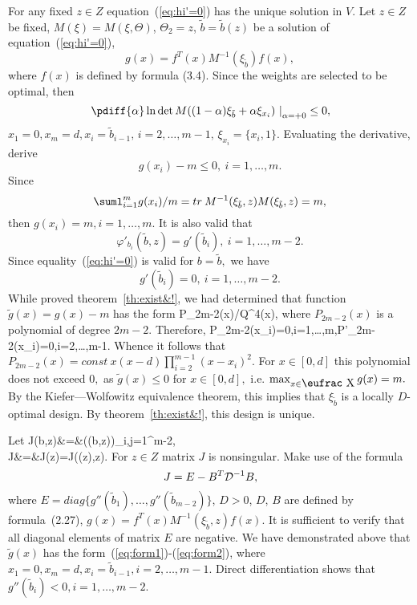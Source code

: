 \bl
 \label{th:system_have_solution}
 For any fixed $z\in Z$ equation~(\ref{eq:hi'=0})
 has the unique solution in $V.$
\el
\bproof
Let $z\in Z$ be fixed, $M(\xi)=M(\xi,\Theta)$, $\Theta_2=z$,
$\tilde{b}=\tilde{b}(z)$ be a solution of equation~(\ref{eq:hi'=0}),
$$
 g(x)=f^T(x)M^{-1}(\xi_{\tilde{b}})f(x),
$$
where $f(x)$ is defined by formula (3.4).
Since the weights are selected to be optimal, then
$$
 \left. \pdiff{\alpha} \ln \det M((1-\alpha)\xi_{\tilde{b}}+\alpha\xi_{x_i}) \
  \right|_{\alpha=+0}\le 0,
$$
$x_1=0,x_m=d,x_i=\tilde{b}_{i-1},\,i=2,\ldots,m-1,\,\xi_{x_i}=\{x_i,1\}.$
Evaluating the derivative, derive
$$
 g(x_i)-m\le 0,\>i=1,\ldots,m.
$$
Since
$$
 \suml_{i=1}^m g(x_i)/m=tr\> M^{-1}(\xi_{\tilde{b}},z)
  M(\xi_{\tilde{b}},z)=m,
$$
then $g(x_i)=m,i=1,\ldots,m$.
It is also valid that
$$
 \varphi'_{b_i}(\tilde{b},z)=g'(\tilde{b}_i),\>i=1,\ldots,m-2.
$$
Since equality~(\ref{eq:hi'=0}) is valid for $b=\tilde{b},$ we have
$$
 g'(\tilde{b}_i)=0,\>i=1,\ldots,m-2.
$$
While proved theorem~\ref{th:exist&!}, we had determined that
function $\tilde{g}(x)=g(x)-m$ has the form
\beq
 P_{2m-2}(x)/Q^4(x),
 \label{eq:form1}
\eeq
where $P_{2m-2}(x)$ is a polynomial of degree $2m-2.$
Therefore,
\beq
 P_{2m-2}(x_i)=0,i=1,\ldots,m,\>\>P'_{2m-2}(x_i)=0,i=2,\ldots,m-1.
 \label{eq:form2}
\eeq
Whence it follows that $P_{2m-2}(x)=const\>x(x-d)\prod_{i=2}^{m-1}(x-x_i)^2.$
For $x\in [0,d]$ this polynomial does not exceed $0,$
as $\tilde{g}(x)\le 0$ for $x\in [0,d],$
i.e. $\max_{x\in{\mbox{\eufrac X}}}g(x)=m.$
By the Kiefer---Wolfowitz equivalence theorem, this implies that
$\xi_{\tilde{b}}$ is a locally $D$-optimal design. By
theorem~\ref{th:exist&!}, this design is unique.
\elproof

Let
\bea
 J(b,z)&=&\left(\varphi(b,z)\right)_{i,j=1}^{m-2},\nonumber\\
 J&=&J(z)=J(\tilde{b}(z),z).\nonumber
\eea
\bl
 \label{th:Junspecial}
 For $z\in Z$ matrix $J$ is nonsingular.
\el
\bproof
Make use of the formula
$$
J=E-B^T{\cal D}^{-1}B,
$$
where $E=diag\{g''(\tilde{b}_1),\ldots,g''(\tilde{b}_{m-2})\}$,
$D>0$, $D$, $B$ are defined by formula~(2.27),
$g(x)=f^T(x)M^{-1}(\xi_{\tilde{b}},z)f(x).$
It is sufficient to verify that all diagonal elements of matrix $E$ are
negative. We have demonstrated above that $\tilde{g}(x)$ has the
form~(\ref{eq:form1})-(\ref{eq:form2}), where
$x_1=0,x_m=d,x_i=\tilde{b}_{i-1},i=2,\ldots,m-1.$
Direct differentiation shows that $g''(\tilde{b}_i)<0,i=1,\ldots,m-2.$
\elproof

